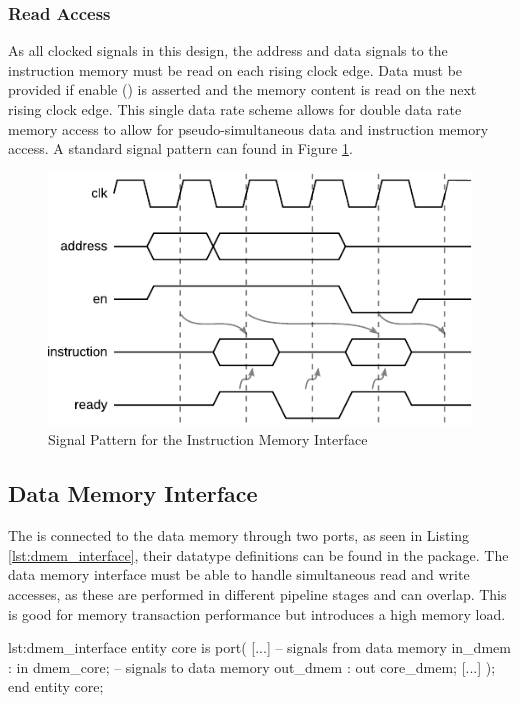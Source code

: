 \subsubsection{Read Access}
As all clocked signals in this design, the address and data signals to the instruction memory must be read on each rising clock edge.
Data must be provided if enable () is asserted and the memory content is read on the next rising clock edge.
This single data rate scheme allows for double data rate memory access to allow for pseudo-simultaneous data and instruction memory access.
A standard signal pattern can found in Figure \ref{fig:signal_imem}.

\begin{figure}[htb]
\centering
\includegraphics[scale=1]{./figures/signal_imem.pdf}
\caption{Signal Pattern for the Instruction Memory Interface}
\label{fig:signal_imem}
\end{figure}

\subsection{Data Memory Interface}
The \procname is connected to the data memory through two ports, as seen in Listing \ref{lst:dmem_interface}, their datatype definitions can be found in the  package.
The data memory interface must be able to handle simultaneous read and write accesses, as these are performed in different pipeline stages and can overlap.
This is good for memory transaction performance but introduces a high memory load.

\begin{vhdl}{lst:dmem_interface}
entity core is
port(
	[...]
	-- signals from data memory
	in_dmem   : in  dmem_core;
	-- signals to data memory
	out_dmem  : out core_dmem;
	[...]
);
end entity core;
\end{vhdl}

